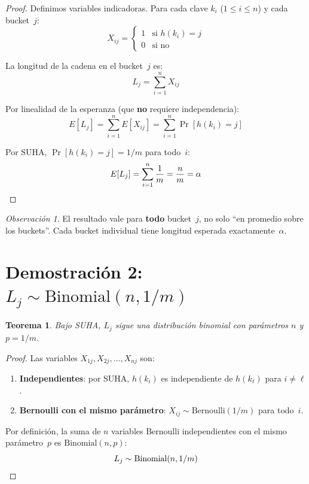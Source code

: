 \documentclass[11pt, letterpaper]{article}
\theoremstyle{definition}
\theoremstyle{plain}
\newtheorem{theorem}{Teorema}[section]
\theoremstyle{remark}
\newtheorem{remark}{Observación}[section]
\begin{document}
\begin{proof}
Definimos variables indicadoras. Para cada clave $k_i$
($1 \leq i \leq n$) y cada bucket~$j$:
\[
  X_{ij} = \begin{cases}
    1 & \text{si } h(k_i) = j \\
    0 & \text{si no}
  \end{cases}
\]

La longitud de la cadena en el bucket~$j$ es:
\[
  L_j = \sum_{i=1}^{n} X_{ij}
\]

Por linealidad de la esperanza (que \textbf{no} requiere
independencia):
\[
  E[L_j] = \sum_{i=1}^{n} E[X_{ij}]
         = \sum_{i=1}^{n} \Pr[h(k_i) = j]
\]

Por SUHA, $\Pr[h(k_i) = j] = 1/m$ para todo~$i$:
\[
  E[L_j] = \sum_{i=1}^{n} \frac{1}{m} = \frac{n}{m} = \alpha
  \qedhere
\]
\end{proof}

\begin{remark}
El resultado vale para \textbf{todo} bucket~$j$, no solo ``en promedio
sobre los buckets''. Cada bucket individual tiene longitud esperada
exactamente~$\alpha$.
\end{remark}

\section{Demostración 2:
  \texorpdfstring{$L_j \sim \mathrm{Binomial}(n, 1/m)$}%
  {Lj ~ Binomial(n, 1/m)}}

\begin{theorem}\label{thm:binomial}
Bajo SUHA, $L_j$ sigue una distribución binomial con parámetros $n$ y
$p = 1/m$.
\end{theorem}

\begin{proof}
Las variables $X_{1j}, X_{2j}, \ldots, X_{nj}$ son:
\begin{enumerate}
  \item \textbf{Independientes}: por SUHA, $h(k_i)$ es independiente
    de $h(k_\ell)$ para $i \neq \ell$.
  \item \textbf{Bernoulli con el mismo parámetro}:
    $X_{ij} \sim \mathrm{Bernoulli}(1/m)$ para todo~$i$.
\end{enumerate}

Por definición, la suma de $n$ variables Bernoulli independientes con
el mismo parámetro~$p$ es $\mathrm{Binomial}(n, p)$:
\[
  L_j \sim \mathrm{Binomial}(n, 1/m) \qedhere
\]
\end{proof}
\end{document}
